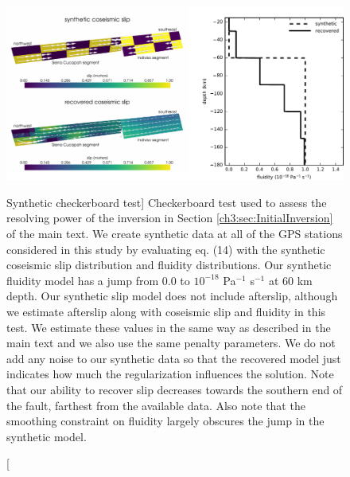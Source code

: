 \begin{figure}
\noindent\includegraphics[scale=0.9]{ch3/figures/2016jb013114-pS02}
\caption
[Synthetic checkerboard test]
{Checkerboard test used to assess the resolving power of the
inversion in Section \ref{ch3:sec:InitialInversion} of the main text.  We create synthetic data
at all of the GPS stations considered in this study by evaluating eq.
(14) with the synthetic coseismic slip distribution and fluidity
distributions. Our synthetic fluidity model has a jump from 0.0 to
$10^{-18}$ Pa$^{-1}$ s$^{-1}$ at 60 km depth.  Our synthetic slip
model does not include afterslip, although we estimate afterslip along
with coseismic slip and fluidity in this test.  We estimate these
values in the same way as described in the main text and we also use
the same penalty parameters.  We do not add any noise to our synthetic
data so that the recovered model just indicates how much the
regularization influences the solution.  Note that our ability to
recover slip decreases towards the southern end of the fault, farthest
from the available data.  Also note that the smoothing constraint on
fluidity largely obscures the jump in the synthetic model.}
\label{ch3:fig:S2}
\end{figure}

